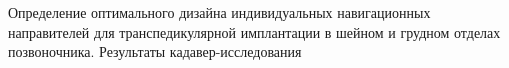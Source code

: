 
Определение оптимального дизайна индивидуальных навигационных
направителей для транспедикулярной имплантации в шейном и грудном
отделах позвоночника. Результаты кадавер-исследования 
